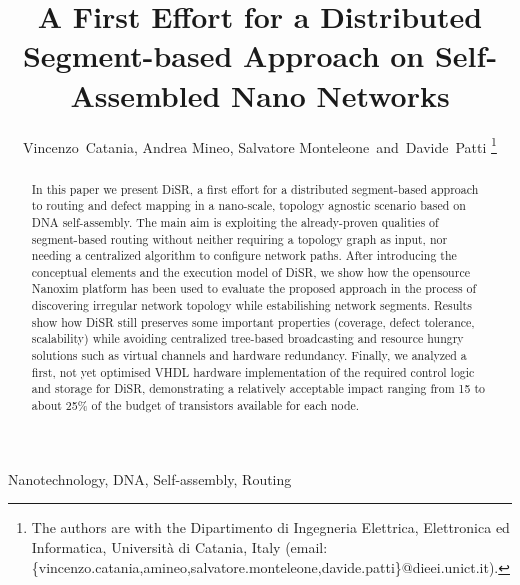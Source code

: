 \documentclass[final,journal,letterpaper]{IEEEtran}
\begin{document}

\title{A First Effort for a Distributed Segment-based Approach on Self-Assembled Nano Networks} 

\author{Vincenzo~Catania, Andrea Mineo, Salvatore Monteleone~and~Davide~Patti%
\thanks{The authors are with the Dipartimento di Ingegneria
Elettrica, Elettronica ed Informatica, Universit\`a di Catania, Italy
(email: \{vincenzo.catania,amineo,salvatore.monteleone,davide.patti\}@dieei.unict.it).}}

\maketitle


\begin{abstract}
In this paper we present DiSR, a first effort for a distributed
segment-based approach to routing and defect mapping in a nano-scale,
topology agnostic scenario based on DNA self-assembly. The main aim is
exploiting the already-proven qualities of segment-based routing
without neither requiring a topology graph as input, nor needing a
centralized algorithm to configure network paths.  After introducing
the conceptual elements and the execution model of DiSR, we show how
the opensource Nanoxim platform has been used to evaluate the proposed
approach in the process of discovering irregular network topology
while estabilishing network segments.  Results show how DiSR still
preserves some important properties (coverage, defect tolerance,
scalability)  while avoiding centralized tree-based broadcasting and
resource hungry solutions such as virtual channels and hardware
redundancy. Finally, we analyzed a first, not yet optimised VHDL
hardware implementation of the required control logic and storage for
DiSR, demonstrating a relatively acceptable impact ranging from 15 to
about 25\% of the budget of transistors available for each node.
\end{abstract}


\begin{IEEEkeywords}
Nanotechnology, DNA, Self-assembly, Routing
\end{IEEEkeywords}
\end{document}
